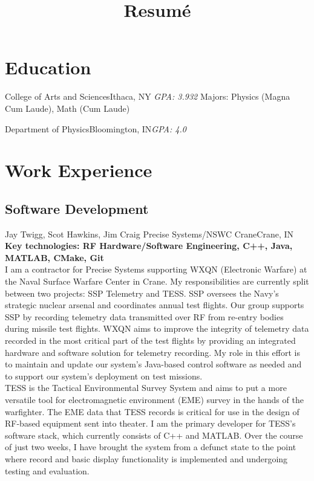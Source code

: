 \documentclass[11pt,a4paper,sans]{moderncv}        %
\title{Resumé}
\newcommand{\techlist}[1]{\textbf{Key technologies: {#1}}\\}
\begin{document}
\makecvtitle

\section{Education}
{College of Arts and Sciences}{Ithaca, NY}
{\textit{GPA: 3.932}}
{Majors: Physics (Magna Cum Laude), Math (Cum Laude)}

{Department of Physics}{Bloomington, IN}{\textit{GPA: 4.0}}{}


\section{Work Experience}
\subsection{Software Development}
{Jay Twigg, Scot Hawkins, Jim Craig}
{Precise Systems/NSWC Crane}{Crane, IN}{
\techlist{RF Hardware/Software Engineering, C++, Java, MATLAB, CMake, Git}
I am a contractor for Precise Systems supporting WXQN (Electronic Warfare) at the Naval Surface Warfare Center in Crane.
My responsibilities are currently split between two projects: SSP Telemetry and TESS.
SSP oversees the Navy's strategic nuclear arsenal and coordinates annual test flights.
Our group supports SSP by recording telemetry data transmitted over RF from re-entry bodies during missile test flights.
WXQN aims to improve the integrity of telemetry data recorded in the most critical part of the test flights by providing an integrated hardware and software solution for telemetry recording.
My role in this effort is to maintain and update our system's Java-based control software as needed and to support our system's deployment on test missions.
\\
TESS is the Tactical Environmental Survey System and aims to put a more versatile tool for electromagnetic environment (EME) survey in the hands of the warfighter.
The EME data that TESS records is critical for use in the design of RF-based equipment sent into theater.
I am the primary developer for TESS's software stack, which currently consists of C++ and MATLAB.
Over the course of just two weeks, I have brought the system from a defunct state to the point where record and basic display functionality is implemented and undergoing testing and evaluation.
}%
\end{document}
